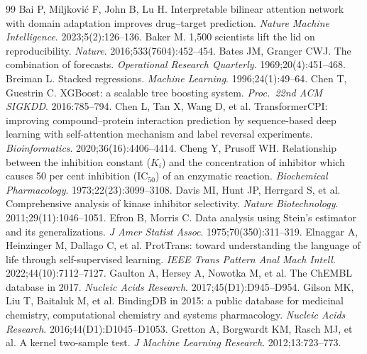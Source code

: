 \documentclass[10pt,letterpaper]{article}
\begin{document}
\begin{thebibliography}{99}
\small
{} Bai P, Miljkovi\'c F, John B, Lu H. Interpretable bilinear attention network with domain adaptation improves drug--target prediction. \emph{Nature Machine Intelligence}. 2023;5(2):126--136.
 Baker M. 1,500 scientists lift the lid on reproducibility. \emph{Nature}. 2016;533(7604):452--454.
 Bates JM, Granger CWJ. The combination of forecasts. \emph{Operational Research Quarterly}. 1969;20(4):451--468.
 Breiman L. Stacked regressions. \emph{Machine Learning}. 1996;24(1):49--64.
 Chen T, Guestrin C. XGBoost: a scalable tree boosting system. \emph{Proc.\ 22nd ACM SIGKDD}. 2016:785--794.
 Chen L, Tan X, Wang D, et al. TransformerCPI: improving compound--protein interaction prediction by sequence-based deep learning with self-attention mechanism and label reversal experiments. \emph{Bioinformatics}. 2020;36(16):4406--4414.
 Cheng Y, Prusoff WH. Relationship between the inhibition constant ($K_i$) and the concentration of inhibitor which causes 50 per cent inhibition (IC$_{50}$) of an enzymatic reaction. \emph{Biochemical Pharmacology}. 1973;22(23):3099--3108.
 Davis MI, Hunt JP, Herrgard S, et al. Comprehensive analysis of kinase inhibitor selectivity. \emph{Nature Biotechnology}. 2011;29(11):1046--1051.
 Efron B, Morris C. Data analysis using Stein's estimator and its generalizations. \emph{J Amer Statist Assoc}. 1975;70(350):311--319.
 Elnaggar A, Heinzinger M, Dallago C, et al. ProtTrans: toward understanding the language of life through self-supervised learning. \emph{IEEE Trans Pattern Anal Mach Intell}. 2022;44(10):7112--7127.
 Gaulton A, Hersey A, Nowotka M, et al. The ChEMBL database in 2017. \emph{Nucleic Acids Research}. 2017;45(D1):D945--D954.
 Gilson MK, Liu T, Baitaluk M, et al. BindingDB in 2015: a public database for medicinal chemistry, computational chemistry and systems pharmacology. \emph{Nucleic Acids Research}. 2016;44(D1):D1045--D1053.
 Gretton A, Borgwardt KM, Rasch MJ, et al. A kernel two-sample test. \emph{J Machine Learning Research}. 2012;13:723--773.

\end{thebibliography}
\end{document}

